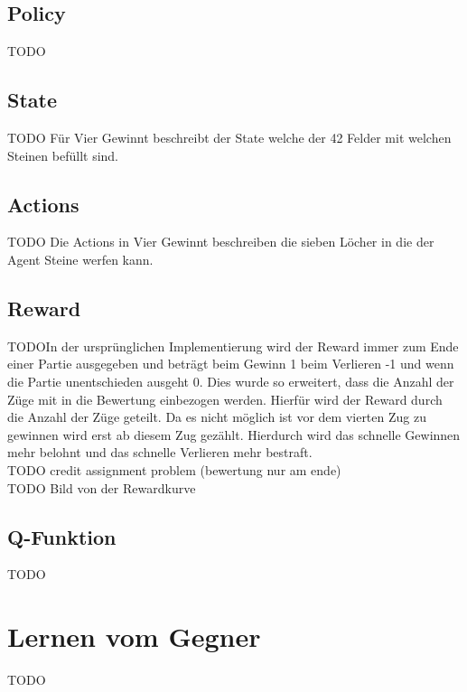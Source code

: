 \subsection{Policy}
\colorbox{red!30}{TODO}

\subsection{State}
\colorbox{red!30}{TODO} Für Vier Gewinnt beschreibt der State welche der 42 Felder mit welchen Steinen befüllt sind. 

\subsection{Actions}
\colorbox{red!30}{TODO} Die Actions in Vier Gewinnt beschreiben die sieben Löcher in die der Agent Steine werfen kann.

\subsection{Reward}
\colorbox{red!30}{TODO}In der ursprünglichen Implementierung wird der Reward immer zum Ende einer Partie ausgegeben und beträgt beim Gewinn 1 beim Verlieren -1 und wenn die Partie unentschieden ausgeht 0.
Dies wurde so erweitert, dass die Anzahl der Züge mit in die Bewertung einbezogen werden. Hierfür wird der Reward durch die Anzahl der Züge geteilt. Da es nicht möglich ist vor dem vierten Zug zu gewinnen wird erst ab diesem Zug gezählt.
Hierdurch wird das schnelle Gewinnen mehr belohnt und das schnelle Verlieren mehr bestraft. \\
\colorbox{red!30}{TODO credit assignment problem (bewertung nur am ende)}\\
\colorbox{red!30}{TODO Bild von der Rewardkurve} 


\subsection{Q-Funktion}
\colorbox{red!30}{TODO} %

\section{Lernen vom Gegner}
\colorbox{red!30}{TODO}